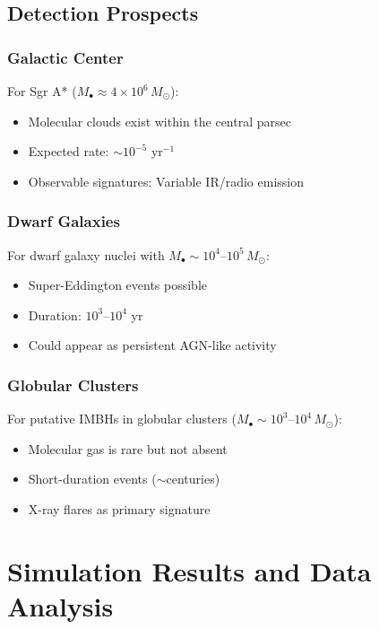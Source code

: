 \documentclass[twocolumn,amsmath,amssymb,prd,superscriptaddress,nofootinbib]{revtex4-2}
\begin{document}
\subsection{Detection Prospects}
\label{sec:detection}

\subsubsection{Galactic Center}

For Sgr A* ($M_\bullet \approx 4 \times 10^6\,M_\odot$):
\begin{itemize}
    \item Molecular clouds exist within the central parsec
    \item Expected rate: $\sim 10^{-5}$ yr$^{-1}$
    \item Observable signatures: Variable IR/radio emission
\end{itemize}

\subsubsection{Dwarf Galaxies}

For dwarf galaxy nuclei with $M_\bullet \sim 10^4$--$10^5\,M_\odot$:
\begin{itemize}
    \item Super-Eddington events possible
    \item Duration: $10^3$--$10^4$ yr
    \item Could appear as persistent AGN-like activity
\end{itemize}

\subsubsection{Globular Clusters}

For putative IMBHs in globular clusters ($M_\bullet \sim 10^3$--$10^4\,M_\odot$):
\begin{itemize}
    \item Molecular gas is rare but not absent
    \item Short-duration events ($\sim$centuries)
    \item X-ray flares as primary signature
\end{itemize}

\section{Simulation Results and Data Analysis}
\label{sec:results}
\end{document}
